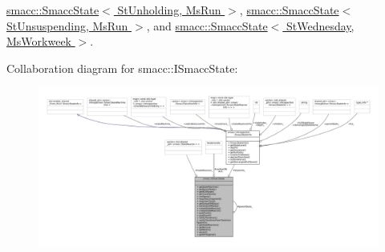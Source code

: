 \hyperlink{classsmacc_1_1SmaccState}{smacc\+::\+Smacc\+State$<$ St\+Unholding, Ms\+Run $>$}, \hyperlink{classsmacc_1_1SmaccState}{smacc\+::\+Smacc\+State$<$ St\+Unsuspending, Ms\+Run $>$}, and \hyperlink{classsmacc_1_1SmaccState}{smacc\+::\+Smacc\+State$<$ St\+Wednesday, Ms\+Workweek $>$}.



Collaboration diagram for smacc\+:\+:I\+Smacc\+State\+:
\nopagebreak
\begin{figure}[H]
\begin{center}
\leavevmode
\includegraphics[width=350pt]{classsmacc_1_1ISmaccState__coll__graph}
\end{center}
\end{figure}
